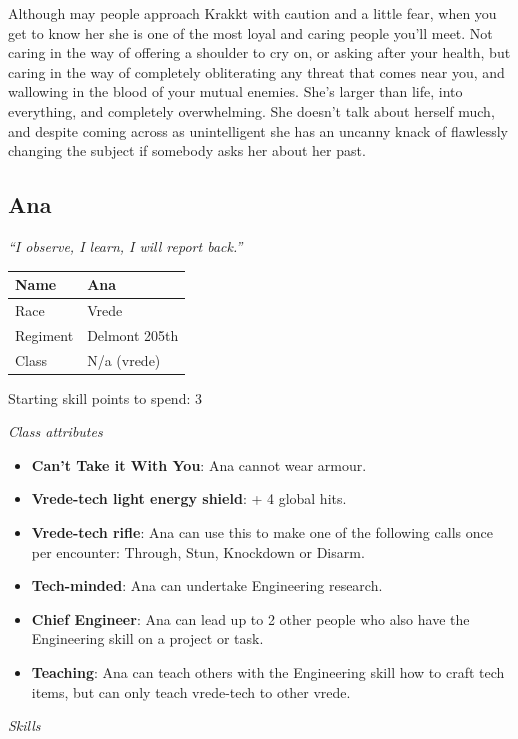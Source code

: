 Although may people approach Krakkt with caution and a little fear, when you get to know her she is one of the most loyal and caring people you'll meet. Not caring in the way of offering a shoulder to cry on, or asking after your health, but caring in the way of completely obliterating any threat that comes near you, and wallowing in the blood of your mutual enemies. She's larger than life, into everything, and completely overwhelming. She doesn't talk about herself much, and despite coming across as unintelligent she has an uncanny knack of flawlessly changing the subject if somebody asks her about her past.

\subsection{Ana}

\textit{``I observe, I learn, I will report back.''}

\begin{table}
\begin{tabular}{|l|l|} \hline 
Name & Ana \\
 \hline Race & Vrede \\
 \hline Regiment & Delmont 205th \\
 \hline Class & N/a (vrede) \\
 \hline \end{tabular}

\end{table}

Starting skill points to spend: 3

\textit{Class attributes}

\begin{itemize}
\item \textbf{Can't Take it With You}: Ana cannot wear armour.

\item \textbf{Vrede-tech light energy shield}: + 4 global hits.

\item \textbf{Vrede-tech rifle}: Ana can use this to make one of the following calls once per encounter: Through, Stun, Knockdown or Disarm.

\item \textbf{Tech-minded}: Ana can undertake Engineering research.

\item \textbf{Chief Engineer}: Ana can lead up to 2 other people who also have the Engineering skill on a project or task.

\item \textbf{Teaching}: Ana can teach others with the Engineering skill how to craft tech items, but can only teach vrede-tech to other vrede.

\end{itemize}
\textit{Skills}

